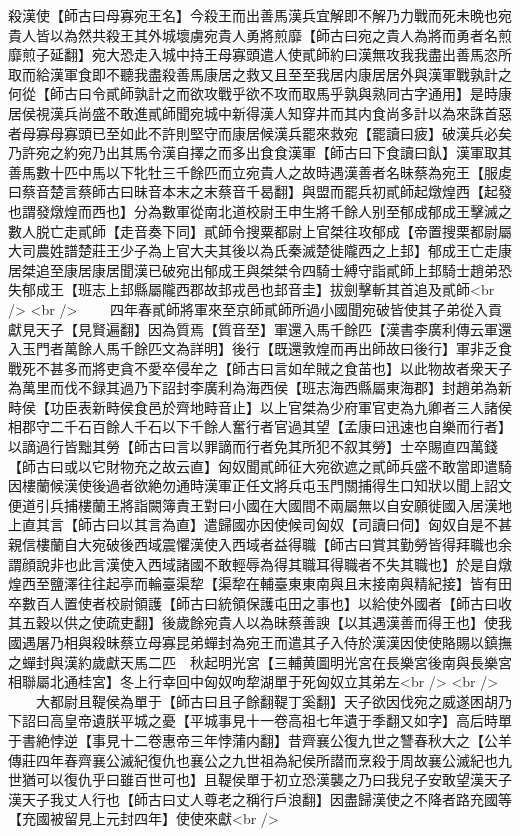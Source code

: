 殺漢使【師古曰母寡宛王名】今殺王而出善馬漢兵宜解即不解乃力戰而死未晩也宛貴人皆以為然共殺王其外城壞虜宛貴人勇將煎靡【師古曰宛之貴人為將而勇者名煎靡煎子延翻】宛大恐走入城中持王母寡頭遣人使貳師約曰漢無攻我我盡出善馬恣所取而給漢軍食即不聽我盡殺善馬康居之救又且至至我居内康居居外與漢軍戰孰計之何從【師古曰令貳師孰計之而欲攻戰乎欲不攻而取馬乎孰與熟同古字通用】是時康居侯視漢兵尚盛不敢進貳師聞宛城中新得漢人知穿井而其内食尚多計以為來誅首惡者母寡母寡頭已至如此不許則堅守而康居候漢兵罷來救宛【罷讀曰疲】破漢兵必矣乃許宛之約宛乃出其馬令漢自擇之而多出食食漢軍【師古曰下食讀曰飤】漢軍取其善馬數十匹中馬以下牝牡三千餘匹而立宛貴人之故時遇漢善者名昧蔡為宛王【服䖍曰蔡音楚言蔡師古曰昧音本末之末蔡音千曷翻】與盟而罷兵初貳師起燉煌西【起發也謂發燉煌而西也】分為數軍從南北道校尉王申生將千餘人别至郁成郁成王擊滅之數人脱亡走貳師【走音奏下同】貳師令搜粟都尉上官桀往攻郁成【帝置搜栗都尉屬大司農姓譜楚莊王少子為上官大夫其後以為氏秦滅楚徙隴西之上邽】郁成王亡走康居桀追至康居康居聞漢已破宛出郁成王與桀桀令四騎士縛守詣貳師上邽騎士趙弟恐失郁成王【班志上邽縣屬隴西郡故邽戎邑也邽音圭】拔劍擊斬其首追及貳師<br />
<br />
　　四年春貳師將軍來至京師貳師所過小國聞宛破皆使其子弟從入貢獻見天子【見賢遍翻】因為質焉【質音至】軍還入馬千餘匹【漢書李廣利傳云軍還入玉門者萬餘人馬千餘匹文為詳明】後行【既還敦煌而再出師故曰後行】軍非乏食戰死不甚多而將吏貪不愛卒侵牟之【師古曰言如牟賊之食苖也】以此物故者衆天子為萬里而伐不録其過乃下詔封李廣利為海西侯【班志海西縣屬東海郡】封趙弟為新畤侯【功臣表新畤侯食邑於齊地畤音止】以上官桀為少府軍官吏為九卿者三人諸侯相郡守二千石百餘人千石以下千餘人奮行者官過其望【孟康曰迅速也自樂而行者】以謫過行皆黜其勞【師古曰言以罪謫而行者免其所犯不叙其勞】士卒賜直四萬錢【師古曰或以它財物充之故云直】匈奴聞貳師征大宛欲遮之貳師兵盛不敢當即遣騎因樓蘭候漢使後過者欲絶勿通時漢軍正任文將兵屯玉門關捕得生口知狀以聞上詔文便道引兵捕樓蘭王將詣闕簿責王對曰小國在大國間不兩屬無以自安願徙國入居漢地上直其言【師古曰以其言為直】遣歸國亦因使候司匈奴【司讀曰伺】匈奴自是不甚親信樓蘭自大宛破後西域震懼漢使入西域者益得職【師古曰賞其勤勞皆得拜職也余謂顔說非也此言漢使入西域諸國不敢輕辱為得其職耳得職者不失其職也】於是自燉煌西至鹽澤往往起亭而輪臺渠犂【渠犂在輔臺東東南與且末接南與精紀接】皆有田卒數百人置使者校尉領護【師古曰統領保護屯田之事也】以給使外國者【師古曰收其五穀以供之使疏吏翻】後歲餘宛貴人以為昧蔡善諛【以其遇漢善而得王也】使我國遇屠乃相與殺昧蔡立母寡昆弟蟬封為宛王而遣其子入侍於漢漢因使使賂賜以鎮撫之蟬封與漢約歲獻天馬二匹　秋起明光宮【三輔黄圖明光宮在長樂宮後南與長樂宮相聯屬北通桂宮】冬上行幸回中匈奴呴犂湖單于死匈奴立其弟左<br />
<br />
　　大都尉且鞮侯為單于【師古曰且子餘翻鞮丁奚翻】天子欲因伐宛之威遂困胡乃下詔曰高皇帝遺朕平城之憂【平城事見十一卷高祖七年遺于季翻又如字】高后時單于書絶悖逆【事見十二卷惠帝三年悖蒲内翻】昔齊襄公復九世之讐春秋大之【公羊傳莊四年春齊襄公滅紀復仇也襄公之九世祖為紀侯所譛而烹殺于周故襄公滅紀也九世猶可以復仇乎曰雖百世可也】且鞮侯單于初立恐漢襲之乃曰我兒子安敢望漢天子漢天子我丈人行也【師古曰丈人尊老之稱行戶浪翻】因盡歸漢使之不降者路充國等【充國被留見上元封四年】使使來獻<br />
